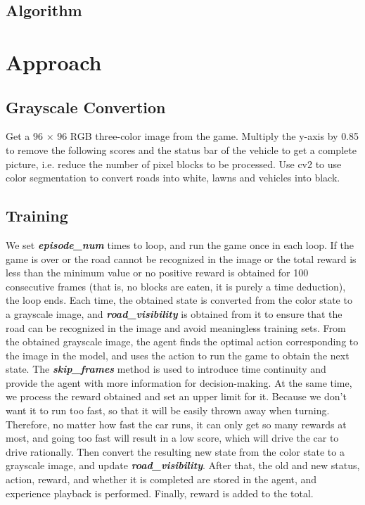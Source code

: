 \documentclass{article}
\begin{document}
\subsection{Algorithm}




\section{Approach}
\label{others}

\subsection{Grayscale Convertion}
Get a 96 $\times$ 96 RGB three-color image from the game. Multiply the y-axis by 0.85
to remove the following scores and the status bar of the vehicle to get a complete picture, 
i.e. reduce the number of pixel blocks to be processed. 
Use cv2 to use color segmentation to convert roads into white, lawns and vehicles into black.

\subsection{Training}
We set \textbf{\textit{episode\_num}} times to loop, and run the game once in each loop. 
If the game is over or the road cannot be recognized in the image or the total 
reward is less than the minimum value or no positive reward is obtained for 100 
consecutive frames (that is, no blocks are eaten, it is purely a time deduction), 
the loop ends. Each time, the obtained state is converted from the color state 
to a grayscale image, and \textbf{\textit{road\_visibility}} is obtained from it to ensure that 
the road can be recognized in the image and avoid meaningless training sets. 
From the obtained grayscale image, the agent finds the optimal action corresponding 
to the image in the model, and uses the action to run the game to obtain the 
next state. The \textbf{\textit{skip\_frames}} method is used to introduce time continuity and 
provide the agent with more information for decision-making. 
At the same time, we process the reward obtained and set an upper limit for it. Because 
we don't want it to run too fast, so that it will be easily thrown away when turning. 
Therefore, no matter how fast the car runs, it can only get so many rewards at most, and 
going too fast will result in a low score, which will drive the car to drive rationally.
Then convert the resulting new state from the color state to a grayscale image, 
and update \textbf{\textit{road\_visibility}}.
After that, the old and new status, action, reward, and whether it is completed are stored 
in the agent, and experience playback is performed. Finally, reward is added to the total. 
\end{document}
